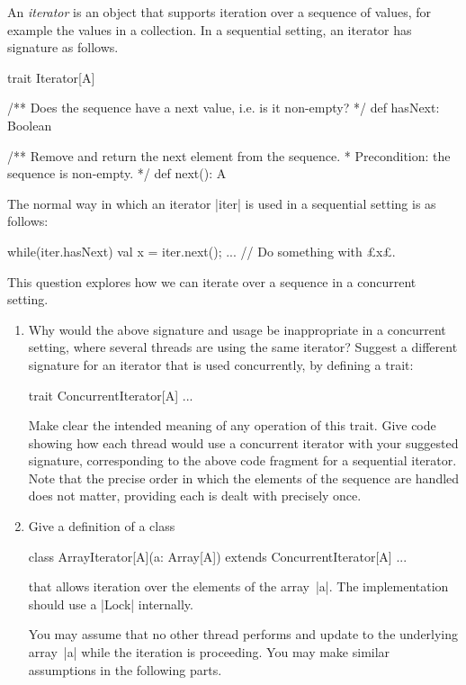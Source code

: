 \begin{question}
An \emph{iterator} is an object that supports iteration over a sequence of
values, for example the values in a collection.  In a sequential setting, an
iterator has signature as follows.
%
\begin{scala}
trait Iterator[A]{
  /** Does the sequence have a next value, i.e. is it non-empty? */
  def hasNext: Boolean

  /** Remove and return the next element from the sequence.
    * Precondition: the sequence is non-empty. */
  def next(): A
}
\end{scala}
%
The normal way in which an iterator |iter| is used in a sequential setting is
as follows:
%
\begin{scala}
while(iter.hasNext){
  val x = iter.next(); ... // Do something with £x£.
}
\end{scala}
%
This question explores how we can iterate over a sequence in a concurrent
setting.


\begin{enumerate}
\item
Why would the above signature and usage be inappropriate in a concurrent
setting, where several threads are using the same iterator?
%
Suggest a different signature for an iterator that is used concurrently, by
defining a trait:
%
\begin{scala}
trait ConcurrentIterator[A]{ ... }
\end{scala}
Make clear the intended meaning of any operation of this trait.
%
Give code showing how each thread would use a concurrent iterator with your
suggested signature, corresponding to the above code fragment for a sequential
iterator.  Note that the precise order in which the elements of the sequence
are handled does not matter, providing each is dealt with precisely once.


\item
Give a definition of a class
%
\begin{scala}
class ArrayIterator[A](a: Array[A]) extends ConcurrentIterator[A]{ ... }
\end{scala}
%
that allows iteration over the elements of the array~|a|.  The implementation
should use a |Lock| internally.

You may assume that no other thread performs and update to the underlying
array~|a| while the iteration is proceeding.  You may make similar assumptions
in the following parts. 


\end{enumerate}
\end{question}
